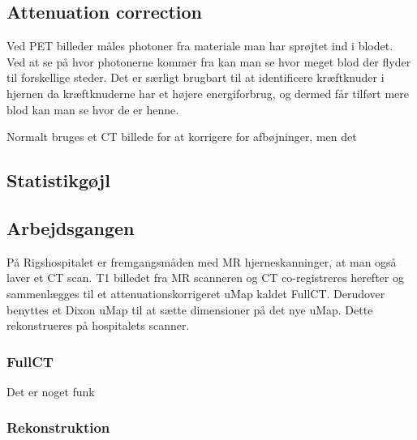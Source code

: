 \subsection{Attenuation correction}
Ved PET billeder måles photoner fra materiale man har sprøjtet ind i blodet. Ved
at se på hvor photonerne kommer fra kan man se hvor meget blod der flyder til
forskellige steder. Det er særligt brugbart til at identificere kræftknuder i
hjernen da kræftknuderne har et højere energiforbrug, og dermed får tilført
mere blod kan man se hvor de er henne.

Normalt bruges et CT billede for at korrigere for afbøjninger, men det  


\subsection{Statistikgøjl}



\subsection{Arbejdsgangen}


På Rigshospitalet er fremgangsmåden med MR
hjerneskanninger, at man også laver et CT scan. T1 billedet fra MR scanneren
og CT co-registreres herefter og sammenlægges til et attenuationskorrigeret
uMap kaldet FullCT. Derudover benyttes et Dixon uMap til at sætte dimensioner
på det nye uMap. Dette rekonstrueres på hospitalets scanner.


\subsubsection{FullCT}


Det er noget funk

\subsubsection{Rekonstruktion}

